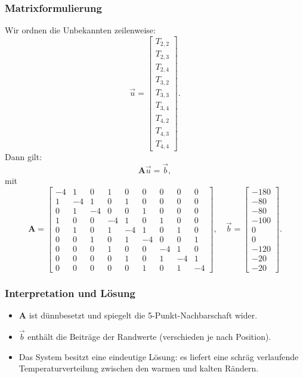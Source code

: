 \subsubsection*{Matrixformulierung}
Wir ordnen die Unbekannten zeilenweise:
\[
\vec{u} =
\begin{bmatrix}
	T_{2,2}\\T_{2,3}\\T_{2,4}\\
	T_{3,2}\\T_{3,3}\\T_{3,4}\\
	T_{4,2}\\T_{4,3}\\T_{4,4}
\end{bmatrix}.
\]
Dann gilt:
\[
\mathbf{A}\vec{u}=\vec{b},
\]
mit
\[
\mathbf{A}=
\begin{bmatrix}
	-4& 1& 0& 1& 0& 0& 0& 0& 0\\
	1&-4& 1& 0& 1& 0& 0& 0& 0\\
	0& 1&-4& 0& 0& 1& 0& 0& 0\\
	1& 0& 0&-4& 1& 0& 1& 0& 0\\
	0& 1& 0& 1&-4& 1& 0& 1& 0\\
	0& 0& 1& 0& 1&-4& 0& 0& 1\\
	0& 0& 0& 1& 0& 0&-4& 1& 0\\
	0& 0& 0& 0& 1& 0& 1&-4& 1\\
	0& 0& 0& 0& 0& 1& 0& 1&-4
\end{bmatrix},
\quad
\vec{b}=
\begin{bmatrix}
	-180\\-80\\-80\\
	-100\\0\\0\\
	-120\\-20\\-20
\end{bmatrix}.
\]

\subsubsection*{Interpretation und Lösung}
\begin{itemize}
	\item $\mathbf{A}$ ist dünnbesetzt und spiegelt die 5-Punkt-Nachbarschaft wider.
	\item $\vec{b}$ enthält die Beiträge der Randwerte (verschieden je nach Position).
	\item Das System besitzt eine eindeutige Lösung: es liefert eine schräg verlaufende Temperaturverteilung zwischen den warmen und kalten Rändern.
\end{itemize}

